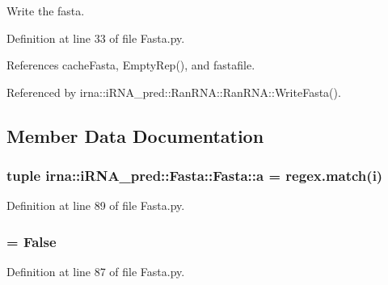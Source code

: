 \-Write the fasta. 



\-Definition at line 33 of file \-Fasta.\-py.



\-References cache\-Fasta, \-Empty\-Rep(), and fastafile.



\-Referenced by irna\-::i\-R\-N\-A\-\_\-pred\-::\-Ran\-R\-N\-A\-::\-Ran\-R\-N\-A\-::\-Write\-Fasta().



\subsection{\-Member \-Data \-Documentation}
\hypertarget{classirna_1_1iRNA__pred_1_1Fasta_1_1Fasta_ae1a5d5e2a5c856ffd0927db279c09653}{
\subsubsection[{a}]{\setlength{\rightskip}{0pt plus 5cm}tuple {\bf irna\-::i\-R\-N\-A\-\_\-pred\-::\-Fasta\-::\-Fasta\-::a} = regex.\-match(i)}}
\label{classirna_1_1iRNA__pred_1_1Fasta_1_1Fasta_ae1a5d5e2a5c856ffd0927db279c09653}


\-Definition at line 89 of file \-Fasta.\-py.

\hypertarget{classirna_1_1iRNA__pred_1_1Fasta_1_1Fasta_ab5a767c5eafaa89945d545e6f76abb41}{
\subsubsection[{cache\-Data}]{ = \-False}}
\label{classirna_1_1iRNA__pred_1_1Fasta_1_1Fasta_ab5a767c5eafaa89945d545e6f76abb41}


\-Definition at line 87 of file \-Fasta.\-py.

